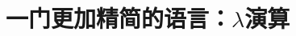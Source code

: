 \documentclass[../main.tex]{subfiles}
\begin{document}
  \section{一门更加精简的语言：$\lambda$演算}

  \begin{thebibliography}{0}
  \end{thebibliography}
\end{document}
